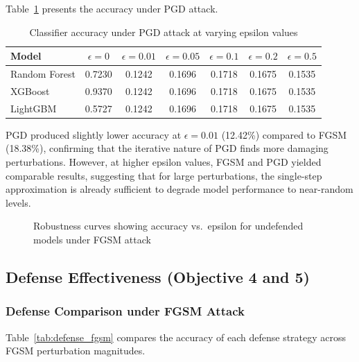 \documentclass[12pt,a4paper,oneside]{report}
\begin{document}
Table~\ref{tab:pgd_impact} presents the accuracy under PGD attack.

\begin{table}[H]
    \centering
    \caption[PGD attack impact on accuracy]{Classifier accuracy under PGD attack at varying epsilon values}\label{tab:pgd_impact}
    \begin{tabular}{lcccccc}
        \toprule
        Model & $\epsilon=0$ & $\epsilon=0.01$ & $\epsilon=0.05$ & $\epsilon=0.1$ & $\epsilon=0.2$ & $\epsilon=0.5$ \\
        \midrule
        Random Forest & 0.7230 & 0.1242 & 0.1696 & 0.1718 & 0.1675 & 0.1535 \\
        XGBoost       & 0.9370 & 0.1242 & 0.1696 & 0.1718 & 0.1675 & 0.1535 \\
        LightGBM      & 0.5727 & 0.1242 & 0.1696 & 0.1718 & 0.1675 & 0.1535 \\
        \bottomrule
    \end{tabular}
\end{table}

PGD produced slightly lower accuracy at $\epsilon = 0.01$ (12.42\%) compared to FGSM (18.38\%), confirming that the iterative nature of PGD finds more damaging perturbations. However, at higher epsilon values, FGSM and PGD yielded comparable results, suggesting that for large perturbations, the single-step approximation is already sufficient to degrade model performance to near-random levels.

\begin{figure}[H]
    \centering
    \caption{Robustness curves showing accuracy vs.~epsilon for undefended models under FGSM attack}\label{fig:robustness}
\end{figure}

\subsection{Defense Effectiveness (Objective 4 and 5)}

\subsubsection{Defense Comparison under FGSM Attack}

Table~\ref{tab:defense_fgsm} compares the accuracy of each defense strategy across FGSM perturbation magnitudes.
\end{document}
